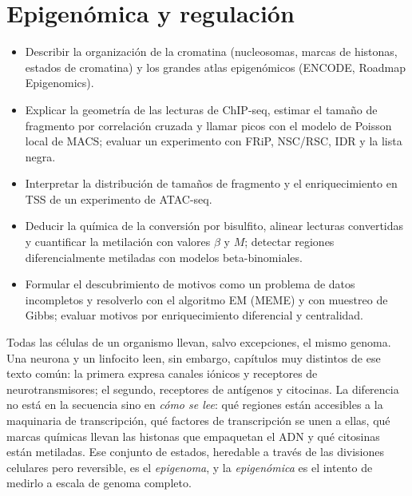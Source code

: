 \chapter{Epigenómica y regulación}\label{cap:13}


\begin{objetivos}
\begin{itemize}
  \item Describir la organización de la cromatina (nucleosomas, marcas de histonas, estados de cromatina) y los grandes atlas epigenómicos (ENCODE, Roadmap Epigenomics).
  \item Explicar la geometría de las lecturas de ChIP-seq, estimar el tamaño de fragmento por correlación cruzada y llamar picos con el modelo de Poisson local de MACS; evaluar un experimento con FRiP, NSC/RSC, IDR y la lista negra.
  \item Interpretar la distribución de tamaños de fragmento y el enriquecimiento en TSS de un experimento de ATAC-seq.
  \item Deducir la química de la conversión por bisulfito, alinear lecturas convertidas y cuantificar la metilación con valores $\beta$ y $M$; detectar regiones diferencialmente metiladas con modelos beta-binomiales.
  \item Formular el descubrimiento de motivos como un problema de datos incompletos y resolverlo con el algoritmo EM (MEME) y con muestreo de Gibbs; evaluar motivos por enriquecimiento diferencial y centralidad.
\end{itemize}
\end{objetivos}

Todas las células de un organismo llevan, salvo excepciones, el mismo genoma. Una neurona y un linfocito leen, sin embargo, capítulos muy distintos de ese texto común: la primera expresa canales iónicos y receptores de neurotransmisores; el segundo, receptores de antígenos y citocinas. La diferencia no está en la secuencia sino en \emph{cómo se lee}: qué regiones están accesibles a la maquinaria de transcripción, qué factores de transcripción se unen a ellas, qué marcas químicas llevan las histonas que empaquetan el ADN y qué citosinas están metiladas. Ese conjunto de estados, heredable a través de las divisiones celulares pero reversible, es el \emph{epigenoma}, y la \emph{epigenómica} es el intento de medirlo a escala de genoma completo.

